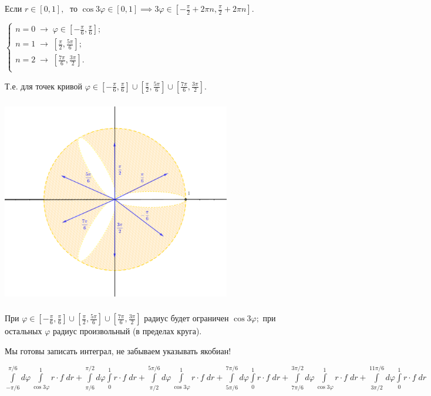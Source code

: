 \documentclass[a4paper, fleqn]{article}
\begin{document}
    Если $r \in [0,1], \; $ то $\cos 3 \varphi \in [0,1] \implies 3 \varphi \in \left[ -\frac{\pi}{2} + 2\pi n, \frac{\pi}{2} + 2\pi n \right].$
    
    \doublespacing $\begin{cases}
    n = 0 \; \to \; \varphi \in \left[ -\frac{\pi}{6},  \frac{\pi}{6} \right];\\
    n = 1\; \to \; \left[\frac{\pi}{2},  \frac{5\pi}{6} \right]; \\
    n = 2\; \to \;  \left[ \frac{7\pi}{6},  \frac{3\pi}{2} \right]. \\
    \end{cases}$
    
    Т.е. для точек кривой $\varphi \in  \left[ -\frac{\pi}{6},  \frac{\pi}{6} \right] \cup \left[\frac{\pi}{2},  \frac{5\pi}{6} \right]\cup \left[ \frac{7\pi}{6},  \frac{3\pi}{2} \right].$
    
    
    \includegraphics[width=10cm, height=9cm]{./list25imgs/task 2.5.5.png}
    
    При  $\varphi \in  \left[ -\frac{\pi}{6},  \frac{\pi}{6} \right] \cup \left[\frac{\pi}{2},  \frac{5\pi}{6} \right]\cup \left[ \frac{7\pi}{6},  \frac{3\pi}{2} \right]$ радиус будет ограничен $\cos 3 \varphi;$ при остальных $\varphi$ радиус произвольный (в пределах круга).
    
    
    \singlespacing Мы готовы записать интеграл, не забываем указывать якобиан!
    
    $\boxed{ \displaystyle \int\limits_{-\pi/6}^{\pi/6} d \varphi \int\limits_{\cos 3 \varphi}^{1} r \cdot f \; dr + \int\limits_{\pi/6}^{\pi/2} d \varphi \int\limits_{0}^{1} r \cdot f \; dr + \int\limits_{\pi/2}^{5\pi/6} d \varphi \int\limits_{\cos 3 \varphi}^{1} r \cdot f \; dr + \int\limits_{5\pi/6}^{7\pi/6} d \varphi \int\limits_{0}^{1} r \cdot f \; dr +
    \int\limits_{7\pi/6}^{3\pi/2} d \varphi \int\limits_{\cos 3 \varphi}^{1} r \cdot f \; dr +  \int\limits_{3\pi/2}^{11\pi/6} d \varphi \int\limits_{0}^{1} r \cdot f \; dr} $
    
\end{document}

